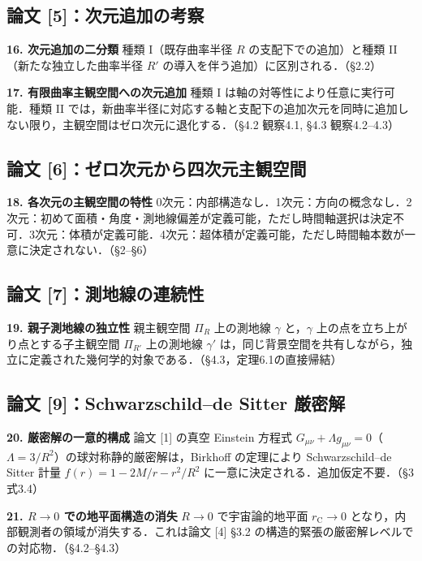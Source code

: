 \documentclass[12pt,a4paper]{ltjsarticle}
\begin{document}
\subsection*{論文 [5]：次元追加の考察}

\textbf{16. 次元追加の二分類}\quad
種類 I（既存曲率半径 $R$ の支配下での追加）と種類 II（新たな独立した曲率半径 $R'$ の導入を伴う追加）に区別される．（\S 2.2）

\textbf{17. 有限曲率主観空間への次元追加}\quad
種類 I は軸の対等性により任意に実行可能．種類 II では，新曲率半径に対応する軸と支配下の追加次元を同時に追加しない限り，主観空間はゼロ次元に退化する．（\S 4.2 観察4.1, \S 4.3 観察4.2--4.3）

\subsection*{論文 [6]：ゼロ次元から四次元主観空間}

\textbf{18. 各次元の主観空間の特性}\quad
0次元：内部構造なし．1次元：方向の概念なし．2次元：初めて面積・角度・測地線偏差が定義可能，ただし時間軸選択は決定不可．3次元：体積が定義可能．4次元：超体積が定義可能，ただし時間軸本数が一意に決定されない．（\S 2--\S 6）

\subsection*{論文 [7]：測地線の連続性}

\textbf{19. 親子測地線の独立性}\quad
親主観空間 $\Pi_R$ 上の測地線 $\gamma$ と，$\gamma$ 上の点を立ち上がり点とする子主観空間 $\Pi_{R'}$ 上の測地線 $\gamma'$ は，同じ背景空間を共有しながら，独立に定義された幾何学的対象である．（\S 4.3，定理6.1の直接帰結）

\subsection*{論文 [9]：Schwarzschild--de Sitter 厳密解}

\textbf{20. 厳密解の一意的構成}\quad
論文 {[1]} の真空 Einstein 方程式 $G_{\mu\nu} + \Lambda g_{\mu\nu} = 0$（$\Lambda = 3/R^2$）の球対称静的厳密解は，Birkhoff の定理により Schwarzschild--de Sitter 計量 $f(r) = 1 - 2M/r - r^2/R^2$ に一意に決定される．追加仮定不要．（\S 3 式3.4）

\textbf{21. $R \to 0$ での地平面構造の消失}\quad
$R \to 0$ で宇宙論的地平面 $r_{\mathrm{C}} \to 0$ となり，内部観測者の領域が消失する．これは論文 {[4]} \S 3.2 の構造的緊張の厳密解レベルでの対応物．（\S 4.2--\S 4.3）
\end{document}
